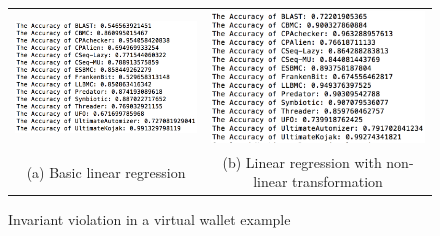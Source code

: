  \begin{figure}
\centering
\begin{tabular}{c c}
\centering
  \includegraphics[width=3in]{figures/linear.PNG} &  \includegraphics[width=3in]{figures/non_lin.PNG} \\ %
  \small (a) Basic linear regression  \label{fig:sub:lin} & 
  \small (b) Linear regression with non-linear transformation \label{fig:sub:non_lin}
\end{tabular}
\caption{Invariant violation in a virtual wallet example}
\label{fig:test_14}
\end{figure}
